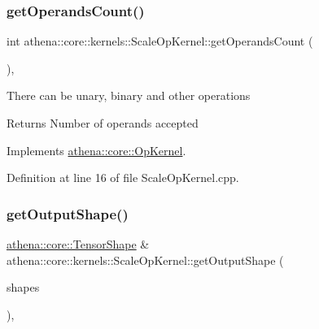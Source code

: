 \mbox{\label{classathena_1_1core_1_1kernels_1_1_scale_op_kernel_a4f9e4fee100ed7f09840fa4b2d55f2bf}} 
\subsubsection{\texorpdfstring{get\+Operands\+Count()}{getOperandsCount()}}
{\footnotesize\ttfamily int athena\+::core\+::kernels\+::\+Scale\+Op\+Kernel\+::get\+Operands\+Count (\begin{DoxyParamCaption}{ }\end{DoxyParamCaption})\hspace{0.3cm}{\ttfamily [override]}, {\ttfamily [virtual]}}

There can be unary, binary and other operations \begin{DoxyReturn}{Returns}
Number of operands accepted 
\end{DoxyReturn}


Implements \mbox{\hyperlink{classathena_1_1core_1_1_op_kernel_add97d4c132d80ecd9915acfedf7c9119}{athena\+::core\+::\+Op\+Kernel}}.



Definition at line 16 of file Scale\+Op\+Kernel.\+cpp.

\mbox{\label{classathena_1_1core_1_1kernels_1_1_scale_op_kernel_ad1791a60026e90c95f248202e1404a26}} 
\subsubsection{\texorpdfstring{get\+Output\+Shape()}{getOutputShape()}}
{\footnotesize\ttfamily \mbox{\hyperlink{classathena_1_1core_1_1_tensor_shape}{athena\+::core\+::\+Tensor\+Shape}} \& athena\+::core\+::kernels\+::\+Scale\+Op\+Kernel\+::get\+Output\+Shape (\begin{DoxyParamCaption}\item[{std\+::vector$<$ \mbox{\hyperlink{classathena_1_1core_1_1_tensor_shape}{athena\+::core\+::\+Tensor\+Shape}} $>$ \&}]{shapes }\end{DoxyParamCaption})\hspace{0.3cm}{\ttfamily [override]}, {\ttfamily [virtual]}}

